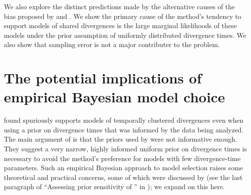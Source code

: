We also explore the distinct predictions made by the alternative causes of the
bias proposed by \citet{Oaks2012} and \citet{Hickerson2013}.
We show the primary cause of the method's tendency to support models of shared
divergences is the large marginal likelihoods of these models under the prior
assumption of uniformly distributed divergence times.
We also show that sampling error is not a major contributer to the problem.



\section{The potential implications of empirical Bayesian model choice}
\citet{Oaks2012} found \msb spuriously supports models of temporally
clustered divergences even when using a prior on divergence times that was
informed by the data being analyzed.
The main argument of \citet{Hickerson2013} is that the priors used by
\citet{Oaks2012} were not informative enough.
They suggest a very narrow, highly informed uniform prior on divergence times
is necessary to avoid the method's preference for models with few
divergence-time parameters.
Such an empirical Bayesian approach to model selection raises some theoretical
and practical concerns, some of which were discussed by \citet{Oaks2012} (see
the last paragraph of ``Assessing prior sensitivity of \msb'' in
\citet{Oaks2012}); we expand on this here.

